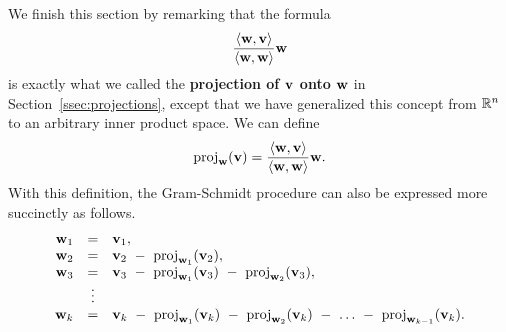 We finish this section by remarking that the formula
\begin{equation*}
  \frac{\iprod{\vect{w},\vect{v}}}{\iprod{\vect{w},\vect{w}}}\vect{w}
\end{equation*}
is exactly what we called the \textbf{projection of $\vect{v}$ onto
  $\vect{w}$}%
%
%
 in Section~\ref{ssec:projections},
except that we have generalized this concept from $\mathbb{R}^n$ to an
arbitrary inner product space. We can define
\begin{equation*}
  \proj_{\vect{w}}(\vect{v})
  = \frac{\iprod{\vect{w},\vect{v}}}{\iprod{\vect{w},\vect{w}}}\vect{w}.
\end{equation*}
With this definition, the Gram-Schmidt procedure can also be expressed
more succinctly as follows.
\begin{equation*}
  \begin{array}{rcl}
    \vect{w}_1
    &=& \vect{v}_1,
    \\
    \vect{w}_2
    &=& \vect{v}_2
        ~-~ \proj_{\vect{w}_1}(\vect{v}_2),
    \\
    \vect{w}_3
    &=& \vect{v}_3
        ~-~ \proj_{\vect{w}_1}(\vect{v}_3)
        ~-~ \proj_{\vect{w}_2}(\vect{v}_3),
    \\
    &\vdots&
    \\
    \vect{w}_k
    &=& \vect{v}_k
        ~-~ \proj_{\vect{w}_1}(\vect{v}_k)
        ~-~ \proj_{\vect{w}_2}(\vect{v}_k)
        ~-~ \ldots
        ~-~ \proj_{\vect{w}_{k-1}}(\vect{v}_k).
  \end{array}
\end{equation*}
  
